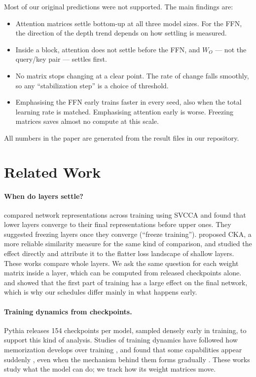 \documentclass[11pt]{article}
\newcommand{\Wo}{W_O}
\begin{document}
Most of our original predictions were not supported. The main findings are:
\begin{itemize}\itemsep0pt \parskip0pt
\item Attention matrices settle bottom-up at all three model sizes. For the
  FFN, the direction of the depth trend depends on how settling is measured.
\item Inside a block, attention does not settle before the FFN, and $\Wo$ ---
  not the query/key pair --- settles first.
\item No matrix stops changing at a clear point. The rate of change falls
  smoothly, so any ``stabilization step'' is a choice of threshold.
\item Emphasising the FFN early trains faster in every seed, also when the
  total learning rate is matched. Emphasising attention early is worse.
  Freezing matrices saves almost no compute at this scale.
\end{itemize}
All numbers in the paper are generated from the result files in our
repository.

\section{Related Work}

\paragraph{When do layers settle?} \citet{raghu2017svcca} compared network
representations across training using SVCCA and found that lower layers
converge to their final representations before upper ones. They suggested
freezing layers once they converge (``freeze training'').
\citet{kornblith2019cka} proposed CKA, a more reliable similarity measure for
the same kind of comparison, and \citet{chen2023which} studied the effect
directly and attribute it to the flatter loss landscape of shallow layers.
These works compare whole layers. We ask the same question for each weight
matrix inside a layer, which can be computed from released checkpoints alone. \citet{frankle2020early} and
\citet{achille2019critical} showed that the first part of training has a large
effect on the final network, which is why our schedules differ mainly in what
happens early.

\paragraph{Training dynamics from checkpoints.} Pythia
\citep{biderman2023pythia} releases 154 checkpoints per model, sampled densely
early in training, to support this kind of analysis. Studies of training
dynamics have followed how memorization develops over training
\citep{tirumala2022memorization}, and found that some capabilities appear
suddenly \citep{olsson2022induction}, even when the mechanism behind them
forms gradually \citep{nanda2023grokking}. These works study what the model
can do; we track how its weight matrices move.
\end{document}

